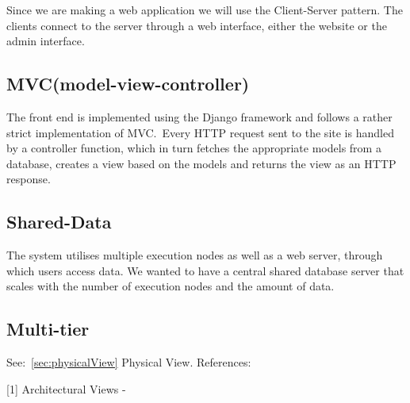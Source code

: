 Since we are making a web application we will use the Client-Server
pattern. The clients connect to the server through a web interface,
either the website or the admin interface. 

\subsection{MVC(model-view-controller)}

The front end is implemented using the Django framework and follows a
rather strict implementation of MVC.\ Every HTTP request sent to the
site is handled by a controller function, which in turn fetches the
appropriate models from a database, creates a view based on the models
and returns the view as an HTTP response. 

\subsection{Shared-Data}

The system utilises multiple execution nodes as well as a web server,
through which users access data. We wanted to have a central shared
database server that scales with the number of execution nodes and the
amount of data. 

\subsection{Multi-tier}

See:~\ref{sec:physicalView} Physical View.
References:

[1] Architectural Views -

